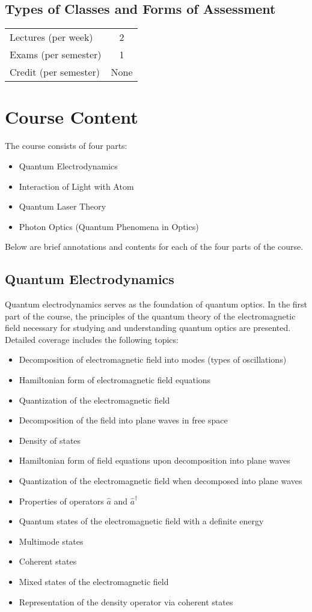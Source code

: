 \subsection{Types of Classes and Forms of Assessment}
\begin{longtable}{|l|c|}
\hline
Lectures (per week) & 2 \\ 
Exams (per semester) & 1 \\
Credit (per semester) & None \\ \hline
\end{longtable}

\section{Course Content}
The course consists of four parts:
\begin{itemize}
\item Quantum Electrodynamics
\item Interaction of Light with Atom
\item Quantum Laser Theory
\item Photon Optics (Quantum Phenomena in Optics)
\end{itemize}

Below are brief annotations and contents for each of
the four parts of the course.

\subsection{Quantum Electrodynamics}
Quantum electrodynamics serves as the foundation of quantum optics. In the first
part of the course, the principles of the quantum theory of the electromagnetic field
necessary for studying and understanding quantum optics are presented. Detailed
coverage includes the following topics:
\begin{itemize}
\item Decomposition of electromagnetic field into modes (types of oscillations)
\item Hamiltonian form of electromagnetic field equations
\item Quantization of the electromagnetic field
\item Decomposition of the field into plane waves in free space
\item Density of states
\item Hamiltonian form of field equations upon decomposition into plane waves
\item Quantization of the electromagnetic field when decomposed into plane waves
\item Properties of operators \( \hat a \) and \( \hat a^\dag \)
\item Quantum states of the electromagnetic field with a definite energy
\item Multimode states
\item Coherent states
\item Mixed states of the electromagnetic field
\item Representation of the density operator via coherent states
\end{itemize}

